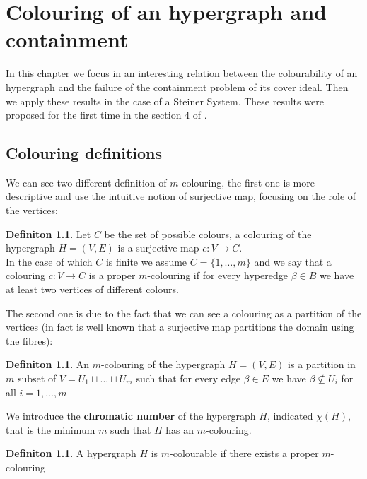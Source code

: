 \documentclass[notitlepage, a4]{book}
\theoremstyle{plain}
\theoremstyle{remark}
\theoremstyle{definition}
\newtheorem{deff}[teo]{Definiton}
\begin{document}
 

\chapter{Colouring of an hypergraph and containment} \label{cha:coul}

In this chapter we focus in an interesting relation between the colourability of an hypergraph and  the failure of the containment problem of its cover ideal. Then we apply these results in the case of a Steiner System. These results were proposed for the first time in the section 4 of \cite{Bal21Steiner}.
 
\section{Colouring definitions}

We can see two different definition of $ m $-colouring, the first one is more descriptive and use the intuitive notion of surjective map, focusing on the role of the vertices: 
\begin{deff}\label{def:colouring1}
Let $ C $ be the set of possible colours, a colouring of the hypergraph $ H = (V,E) $ is a surjective map $ c : V \to C $. \\
In the case of which $ C $ is finite we assume $ C = \{1 , \dots , m\} $ and we say that a colouring $ c : V \to C $ is a proper $ m $-colouring if for every hyperedge $ \beta \in B $ we have at least two vertices of different colours. 
\end{deff}

The second one is due to the fact that we can see a colouring as a partition of the vertices (in fact is well known that a surjective map partitions the domain using the fibres):

\begin{deff}
An $ m $-colouring of the hypergraph $ H = (V,E) $ is a partition in $ m $ subset of $ V = U_1 \sqcup ... \sqcup U_m $ such that for every edge $ \beta \in E $ we have $ \beta \not \subseteq U_i $ for all $ i = 1, ... , m $
\end{deff}
 
We introduce the \textbf{chromatic number} of the hypergraph $ H $, indicated $ \chi(H) $, that is the minimum $ m $ such that $ H $ has an $ m $-colouring.

\begin{deff}
A hypergraph $ H $ is $ m $-colourable if there exists a proper $ m $-colouring
\end{deff}
\end{document}
